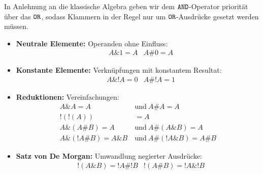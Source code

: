 \begin{definition}{}
    In Anlehnung an die klassische Algebra geben wir dem $\texttt{AND}$-Operator priorität über das $\texttt{OR}$, sodass Klammern in der Regel nur um $\texttt{OR}$-Ausdrücke gesetzt werden müssen.
    \begin{itemize}
        \item \textbf{Neutrale Elemente:} Operanden ohne Einfluss:
        \begin{align*}
            &A \& 1 = A     &A \# 0 = A
        \end{align*}
        \item \textbf{Konstante Elemente:} Verknüpfungen mit konstantem Resultat:
        \begin{align*}
            &A \& !A = 0    &A \# !A = 1
        \end{align*}
        \item \textbf{Reduktionen:} Vereinfachungen:
        \begin{align*}
            A \& A = A \ &\text{und} \ A \# A = A \\
            !(!(A)) &= A \\
            A \& (A \# B) = A \ &\text{und} \ A \# (A \& B) = A \\
            A \& (!A \# B) = A \& B \ &\text{und} \ A \# (!A \& B) = A \# B
        \end{align*}
        \item \textbf{Satz von De Morgan:} Umwandlung negierter Ausdrücke:
        \begin{align*}
            &!(A \& B) = !A \# !B   &!(A \# B) = !A \& !B
        \end{align*}
    \end{itemize}
\end{definition}